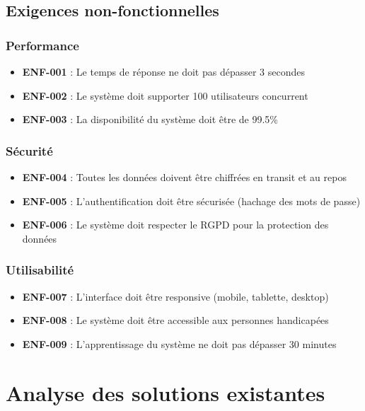 \subsection{Exigences non-fonctionnelles}

\subsubsection{Performance}
\begin{itemize}
    \item \textbf{ENF-001} : Le temps de réponse ne doit pas dépasser 3 secondes
    \item \textbf{ENF-002} : Le système doit supporter 100 utilisateurs concurrent
    \item \textbf{ENF-003} : La disponibilité du système doit être de 99.5\%
\end{itemize}

\subsubsection{Sécurité}
\begin{itemize}
    \item \textbf{ENF-004} : Toutes les données doivent être chiffrées en transit et au repos
    \item \textbf{ENF-005} : L'authentification doit être sécurisée (hachage des mots de passe)
    \item \textbf{ENF-006} : Le système doit respecter le RGPD pour la protection des données
\end{itemize}

\subsubsection{Utilisabilité}
\begin{itemize}
    \item \textbf{ENF-007} : L'interface doit être responsive (mobile, tablette, desktop)
    \item \textbf{ENF-008} : Le système doit être accessible aux personnes handicapées
    \item \textbf{ENF-009} : L'apprentissage du système ne doit pas dépasser 30 minutes
\end{itemize}

\section{Analyse des solutions existantes}

